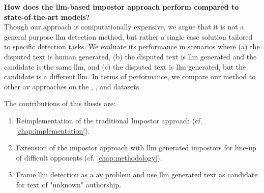 \begin{questions}

    \item \textbf{How does the \ac{llm}-based impostor approach perform compared to state-of-the-art models?} \label{enum:rq4} \hfill \\
    Though our approach is computationally expensive, we argue that it is not a general purpose \ac{llm} detection method, but rather a single case solution tailored to specific detection tasks.
    We evaluate its performance in scenarios where (a) the disputed text is human generated,
    (b) the disputed text is \ac{llm} generated and the candidate is the same \ac{llm}, and
    (c) the disputed text is \ac{llm} generated, but the candidate is a different \ac{llm}.
    In terms of performance, we compare our method to other \ac{av} approaches on the \dataStudent{}, \dataBlog{}, \dataGutenberg{} and \dataPan{} datasets.
    
\end{questions}





The contributions of this thesis are:
\begin{enumerate}
    \item Reimplementation of the traditional Impostor approach (cf. \autoref{chap:implementation}).
    \item Extension of the impostor approach with \ac{llm} generated impostors for line-up of difficult opponents (cf. \autoref{chap:methodology}). 
    \item Frame \ac{llm} detection as a \ac{av} problem and use \ac{llm} generated text as candidate for text of "unknown" authorship.
\end{enumerate}
